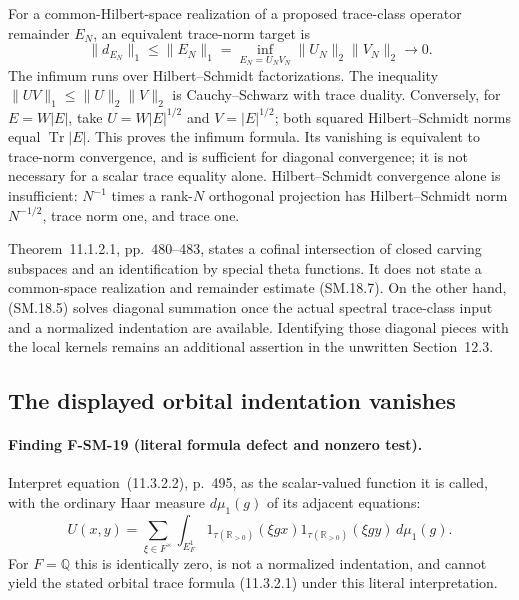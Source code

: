 \documentclass[11pt,a4paper]{article}
\theoremstyle{definition}\newtheorem{definition}[theorem]{Definition}
\theoremstyle{remark}\newtheorem{remark}[theorem]{Remark}
\begin{document}
For a common-Hilbert-space realization of a proposed trace-class
operator remainder $E_N$, an equivalent trace-norm target is
\[
 \|d_{E_N}\|_1\leq\|E_N\|_1
   =\inf_{E_N=U_NV_N}\|U_N\|_2\|V_N\|_2\longrightarrow0.
 \tag{SM.18.7}
\]
The infimum runs over Hilbert--Schmidt factorizations.
The inequality $\|UV\|_1\leq\|U\|_2\|V\|_2$ is
Cauchy--Schwarz with trace duality.  Conversely, for
$E=W|E|$, take $U=W|E|^{1/2}$ and $V=|E|^{1/2}$;
both squared Hilbert--Schmidt norms equal $\operatorname{Tr}|E|$.
This proves the infimum formula.  Its vanishing is equivalent
to trace-norm convergence, and is sufficient for diagonal
convergence; it is not necessary for a scalar trace equality alone.
Hilbert--Schmidt convergence alone is insufficient: $N^{-1}$
times a rank-$N$ orthogonal projection has Hilbert--Schmidt norm
$N^{-1/2}$, trace norm one, and trace one.

Theorem~11.1.2.1, pp.~480--483, states a cofinal intersection
of closed carving subspaces and an identification by special
theta functions.  It does not state a common-space realization
and remainder estimate (SM.18.7).  On the other hand,
(SM.18.5) solves diagonal summation once the actual spectral
trace-class input and a normalized indentation are available.
Identifying those diagonal pieces with the local kernels remains
an additional assertion in the unwritten Section~12.3.

\subsection{The displayed orbital indentation vanishes}

\paragraph{Finding F-SM-19 (literal formula defect and nonzero test).}
Interpret equation~(11.3.2.2), p.~495, as the scalar-valued
function it is called, with the ordinary Haar measure
$d\mu_1(g)$ of its adjacent equations:
\[
 U(x,y)=\sum_{\xi\in F^\times}\int_{E_F^1}
   1_{\tau(\mathbb R_{>0})}(\xi gx)
   1_{\tau(\mathbb R_{>0})}(\xi gy)\,d\mu_1(g).
 \tag{SM.19.1}
\]
For $F=\mathbb Q$ this is identically zero, is not a normalized
indentation, and cannot yield the stated orbital trace formula
(11.3.2.1) under this literal interpretation.
\end{document}
